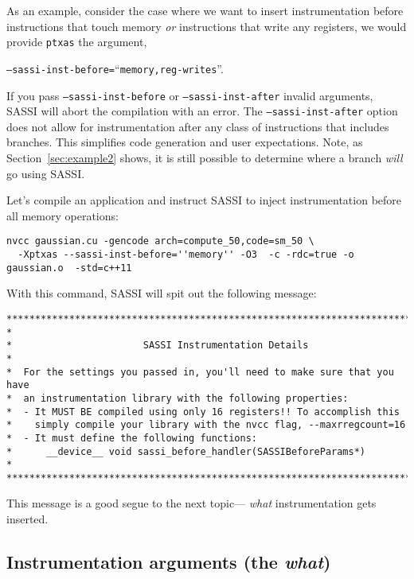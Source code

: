 As an example, consider the case where we want to insert
instrumentation before instructions that touch memory \emph{or}
instructions that write any registers, we would provide \texttt{ptxas}
the argument,\\ 
\begin{center}
\texttt{--sassi-inst-before=}``\texttt{memory,reg-writes}''.
\end{center}

If you pass \texttt{--sassi-inst-before} or
\texttt{--sassi-inst-after} invalid arguments, SASSI will abort the
compilation with an error.  The \texttt{--sassi-inst-after} option
does not allow for instrumentation after any class of instructions
that includes branches. This simplifies code generation and user
expectations.  Note, as Section~\ref{sec:example2} shows, it is still
possible to determine where a branch \emph{will} go using SASSI.

Let's compile an application and instruct SASSI to inject
instrumentation before all memory operations:

\begin{lstlisting}[style=BashInputStyle]
nvcc gaussian.cu -gencode arch=compute_50,code=sm_50 \
  -Xptxas --sassi-inst-before=''memory'' -O3  -c -rdc=true -o gaussian.o  -std=c++11
\end{lstlisting}

With this command, SASSI will spit out the following message:
\begin{verbatim}
******************************************************************************
*
*                       SASSI Instrumentation Details
*
*  For the settings you passed in, you'll need to make sure that you have
*  an instrumentation library with the following properties:
*  - It MUST BE compiled using only 16 registers!! To accomplish this
*    simply compile your library with the nvcc flag, --maxrregcount=16
*  - It must define the following functions:
*      __device__ void sassi_before_handler(SASSIBeforeParams*)
*
******************************************************************************
\end{verbatim}

This message is a good segue to the next topic--- \emph{what}
instrumentation gets inserted.

\subsection{Instrumentation arguments (the \emph{what})}


